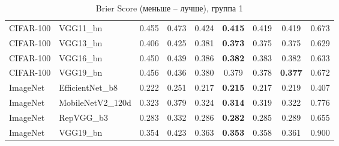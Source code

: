 \begin{table}[h!]
{\begin{tabular}{llccccccc}
CIFAR-100 &          VGG11\_bn &                  0.455 &        0.473 &                  0.424 & \textbf{0.415} &     0.419 &                  0.419 &       0.673 \\
CIFAR-100 &          VGG13\_bn &                  0.406 &        0.425 &                  0.381 & \textbf{0.373} &     0.375 &                  0.375 &       0.629 \\
CIFAR-100 &          VGG16\_bn &                  0.450 &        0.439 &                  0.386 & \textbf{0.382} &     0.383 &                  0.382 &       0.633 \\
CIFAR-100 &          VGG19\_bn &                  0.456 &        0.436 &                  0.380 &                  0.379 &     0.378 & \textbf{0.377} &       0.672 \\
 ImageNet &   EfficientNet\_b8 &                  0.222 &        0.251 &                  0.217 & \textbf{0.215} &     0.217 &                  0.219 &       0.407 \\
 ImageNet &  MobileNetV2\_120d &                  0.323 &        0.379 &                  0.324 & \textbf{0.314} &     0.319 &                  0.322 &       0.776 \\
 ImageNet &         RepVGG\_b3 &                  0.283 &        0.332 &                  0.286 & \textbf{0.282} &     0.285 &                  0.289 &       0.655 \\
 ImageNet &          VGG19\_bn &                  0.354 &        0.423 &                  0.363 & \textbf{0.353} &     0.358 &                  0.361 &       0.900 \\
\bottomrule
\end{tabular}%
}
\caption{Brier Score (меньше -- лучше), группа 1}
\label{tab:metrics:BS_1}
\end{table}
